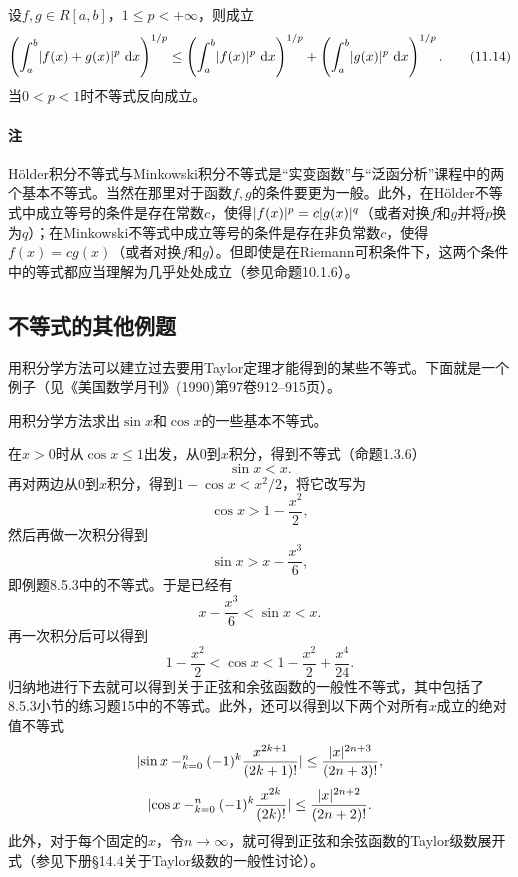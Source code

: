 \begin{xproposition}[11.2.5（Minkowski不等式）]
设$f,g\in R[a,b]$，$1\le p<+\infty$，则成立
\begin{equation}
  \left(\int_a^b\lvert f(x)+g(x)\rvert^p\,\mathop{}\!\mathrm{d} x\right)^{1/p}
  \le\left(\int_a^b\lvert f(x)\rvert^p\,\mathop{}\!\mathrm{d} x\right)^{1/p}
  +\left(\int_a^b\lvert g(x)\rvert^p\,\mathop{}\!\mathrm{d} x\right)^{1/p}.
  \tag{11.14}
  \label{eq:11.14}
\end{equation}
当$0<p<1$时不等式反向成立。
\end{xproposition}

\paragraph{注} Hölder积分不等式与Minkowski积分不等式是“实变函数”与“泛函分析”课程中的两个基本不等式。当然在那里对于函数$f,g$的条件要更为一般。此外，在Hölder不等式中成立等号的条件是存在常数$c$，使得$\lvert f(x)\rvert^p=c\lvert g(x)\rvert^q$（或者对换$f$和$g$并将$p$换为$q$）；在Minkowski不等式中成立等号的条件是存在非负常数$c$，使得$f(x)=cg(x)$（或者对换$f$和$g$）。但即使是在Riemann可积条件下，这两个条件中的等式都应当理解为几乎处处成立（参见命题10.1.6）。

\subsection{不等式的其他例题}

用积分学方法可以建立过去要用Taylor定理才能得到的某些不等式。下面就是一个例子（见《美国数学月刊》(1990)第97卷912--915页）。

\begin{xexample}[11.2.4]
用积分学方法求出$\sin x$和$\cos x$的一些基本不等式。
\end{xexample}
\begin{xsolution}
在$x>0$时从$\cos x\le1$出发，从0到$x$积分，得到不等式（命题1.3.6）
\[
  \sin x<x.
\]
再对两边从0到$x$积分，得到$1-\cos x<x^2/2$，将它改写为
\[
  \cos x>1-\frac{x^2}{2},
\]
然后再做一次积分得到
\[
  \sin x>x-\frac{x^3}{6},
\]
即例题8.5.3中的不等式。于是已经有
\[
  x-\frac{x^3}{6}<\sin x<x.
\]
再一次积分后可以得到
\[
  1-\frac{x^2}{2}<\cos x<1-\frac{x^2}{2}+\frac{x^4}{24}.
\]
归纳地进行下去就可以得到关于正弦和余弦函数的一般性不等式，其中包括了8.5.3小节的练习题15中的不等式。此外，还可以得到以下两个对所有$x$成立的绝对值不等式
\[
  \lvert\sin x-\relax_{k=0}^n(-1)^k\frac{x^{2k+1}}{(2k+1)!}\rvert
  \le\frac{\lvert x\rvert^{2n+3}}{(2n+3)!},
\]
\[
  \lvert\cos x-\relax_{k=0}^n(-1)^k\frac{x^{2k}}{(2k)!}\rvert
  \le\frac{\lvert x\rvert^{2n+2}}{(2n+2)!}.
\]
此外，对于每个固定的$x$，令$n\to\infty$，就可得到正弦和余弦函数的Taylor级数展开式（参见下册§14.4关于Taylor级数的一般性讨论）。
\end{xsolution}

